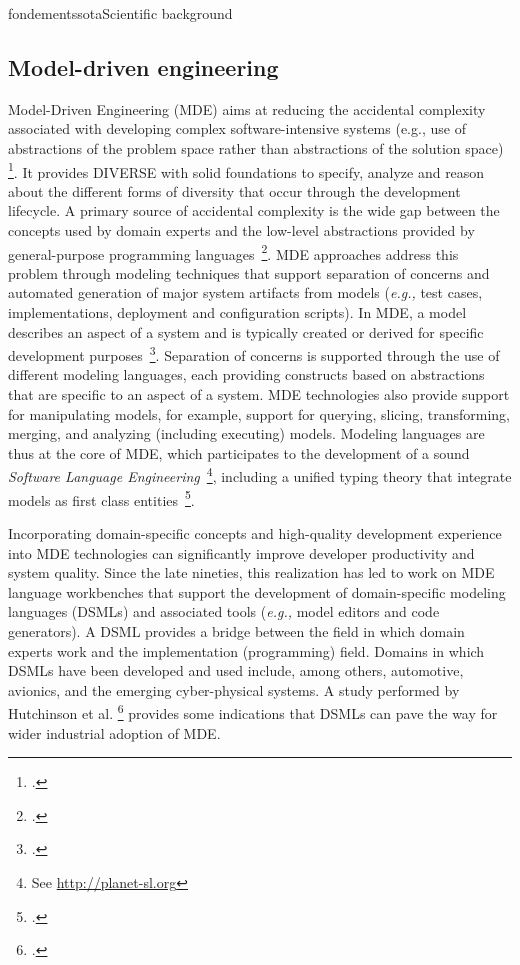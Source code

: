 \documentclass{ra2018}
\newcommand{\team}{DIVERSE}
\begin{document}
\begin{module}{fondements}{sota}{Scientific background}
\label{sec:sota}

\subsection{Model-driven engineering}    

Model-Driven Engineering (MDE) aims at reducing the accidental complexity associated with developing complex software-intensive systems (e.g., use of abstractions of the problem space rather than abstractions of the solution space)  \footcite{Schmidt06}. It provides \team{} with solid foundations to specify, analyze and reason about the different forms of diversity that occur through the development lifecycle. A primary source of accidental complexity is the wide gap between the concepts used by domain experts and the low-level abstractions provided by general-purpose programming languages~\footcite{France07}. MDE approaches address this problem through  modeling techniques that support separation of concerns and automated generation of major system artifacts from models (\emph{e.g.,} test cases, implementations, deployment and configuration scripts). In MDE, a model describes an aspect of a system and is typically created or derived for specific development purposes~\footcite{BAN04}. Separation of concerns is supported through the use of different modeling languages, each providing constructs based on abstractions that are specific to an aspect of a system. MDE technologies also provide support for manipulating models, for example, support for querying, slicing, transforming, merging, and analyzing (including executing) models. Modeling languages are thus at the core of MDE, which participates to the development of a sound \emph{Software Language Engineering}~\footnote{See \url{http://planet-sl.org}}, including a unified typing theory that integrate models as first class entities~\footcite{Steel07a}. 

Incorporating domain-specific concepts and high-quality development experience into MDE technologies can significantly improve developer productivity and system quality. Since the late nineties, this realization has led to work on MDE language workbenches that support the development of domain-specific modeling languages (DSMLs) and associated tools (\emph{e.g.,} model editors and code generators). A DSML provides a bridge between the field in which domain experts work and the implementation (programming) field. Domains in which DSMLs have been developed and used include, among others, automotive, avionics, and the emerging cyber-physical systems. A study performed by Hutchinson et al.   \footcite{Hutchinson11} provides some indications that DSMLs can pave the way for wider industrial adoption of MDE.


\end{module}
\end{document}
